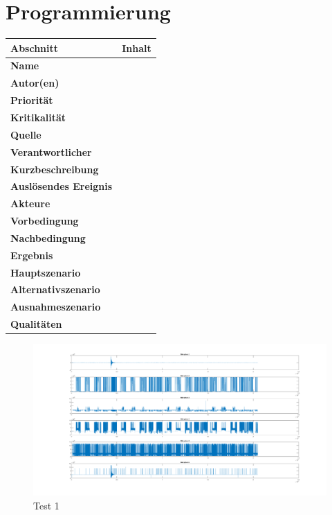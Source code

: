 \section{Programmierung}

\begin{tabularx}{\columnwidth}{|p{4cm}|X|}
	\hline
	\textbf{Abschnitt} & \textbf{Inhalt}\\
	\hline
	\textbf{Name} & \\
	\hline
	\textbf{Autor(en)} & \\
	\hline
	\textbf{Priorität} & \\	
	\hline	
	\textbf{Kritikalität} &\\
	\hline
	\textbf{Quelle} & \\
	\hline
	\textbf{Verantwortlicher} & \\
	\hline
	\textbf{Kurzbeschreibung} & \\
	\hline
	\textbf{Auslösendes Ereignis} & \\
	\hline
	\textbf{Akteure} & \\
	\hline
	\textbf{Vorbedingung} & \\
	\hline
	\textbf{Nachbedingung} & \\
	\hline
	\textbf{Ergebnis} & \\
	\hline
	\textbf{Hauptszenario} &\\
	\hline
	\textbf{Alternativszenario} & \\
	\hline
	\textbf{Ausnahmeszenario} & \\
	\hline
	\textbf{Qualitäten} & \\
	\hline
\end{tabularx}
\label{tab:}

\newpage
%

\begin{figure}[h]
	\begin{center}
		\includegraphics[scale=0.2]{Sections/Programmierung/Test_1}
	\end{center}
	\caption{Test 1}
	\label{fig:Test_1}
\end{figure}

